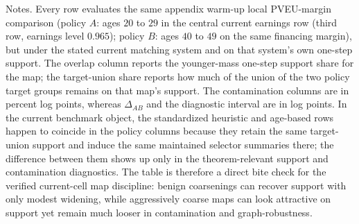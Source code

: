 \begin{table}[t]
\centering
\caption{Same policy object under alternative current matching systems}
\label{tab:policy-map-comparison}
\footnotesize
\renewcommand{\arraystretch}{1.08}
\begin{minipage}{0.98\textwidth}
\footnotesize Notes. Every row evaluates the same appendix warm-up local PVEU-margin comparison (policy $A$: ages $20$ to $29$ in the central current earnings row (third row, earnings level $0.965$); policy $B$: ages $40$ to $49$ on the same financing margin), but under the stated current matching system and on that system's own one-step support. The overlap column reports the younger-mass one-step support share for the map; the target-union share reports how much of the union of the two policy target groups remains on that map's support. The contamination columns are in percent log points, whereas $\Delta_{AB}$ and the diagnostic interval are in log points. In the current benchmark object, the standardized heuristic and age-based rows happen to coincide in the policy columns because they retain the same target-union support and induce the same maintained selector summaries there; the difference between them shows up only in the theorem-relevant support and contamination diagnostics. The table is therefore a direct bite check for the verified current-cell map discipline: benign coarsenings can recover support with only modest widening, while aggressively coarse maps can look attractive on support yet remain much looser in contamination and graph-robustness.
\end{minipage}
\end{table}
